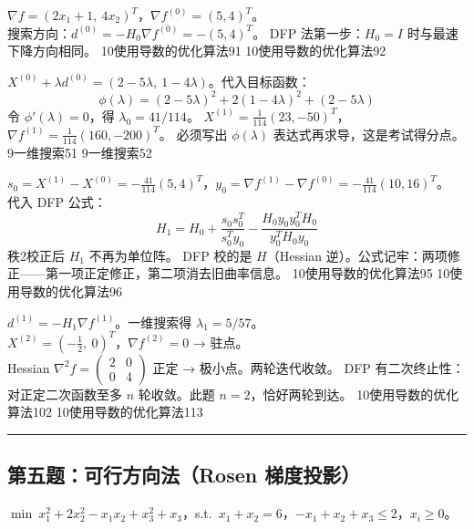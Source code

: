   {$\nabla f = (2x_1+1,\ 4x_2)^T$，$\nabla f^{(0)} = (5, 4)^T$。\\
  搜索方向：$d^{(0)} = -H_0 \nabla f^{(0)} = -(5, 4)^T$。}
  {DFP 法第一步：$H_0=I$ 时与最速下降方向相同。}
  {10使用导数的优化算法}{91}
  {10使用导数的优化算法}{92}

  {$X^{(0)} + \lambda d^{(0)} = (2-5\lambda,\ 1-4\lambda)$。代入目标函数：
  \[
  \phi(\lambda) = (2-5\lambda)^2 + 2(1-4\lambda)^2 + (2-5\lambda)
  \]
  令 $\phi'(\lambda)=0$，得 $\lambda_0 = 41/114$。
  $X^{(1)} = \frac{1}{114}(23, -50)^T$，
  $\nabla f^{(1)} = \frac{1}{114}(160, -200)^T$。}
  {必须写出 $\phi(\lambda)$ 表达式再求导，这是考试得分点。}
  {9一维搜索}{51}
  {9一维搜索}{52}

  {$s_0 = X^{(1)}-X^{(0)} = -\frac{41}{114}(5,4)^T$，$y_0 = \nabla f^{(1)}-\nabla f^{(0)} = -\frac{41}{114}(10,16)^T$。\\
  代入 DFP 公式：
  \[
  H_1 = H_0 + \frac{s_0 s_0^T}{s_0^T y_0} - \frac{H_0 y_0 y_0^T H_0}{y_0^T H_0 y_0}
  \]
  秩2校正后 $H_1$ 不再为单位阵。}
  {DFP 校的是 $H$（Hessian 逆）。公式记牢：两项修正——第一项正定修正，第二项消去旧曲率信息。}
  {10使用导数的优化算法}{95}
  {10使用导数的优化算法}{96}

  {$d^{(1)} = -H_1 \nabla f^{(1)}$。一维搜索得 $\lambda_1 = 5/57$。\\
  $X^{(2)} = (-\frac{1}{2},\ 0)^T$，$\nabla f^{(2)} = 0$ → 驻点。\\
  Hessian $\nabla^2 f = \begin{pmatrix}2&0\\0&4\end{pmatrix}$ 正定 → 极小点。两轮迭代收敛。}
  {DFP 有二次终止性：对正定二次函数至多 $n$ 轮收敛。此题 $n=2$，恰好两轮到达。}
  {10使用导数的优化算法}{102}
  {10使用导数的优化算法}{113}

\rule{\textwidth}{0.4pt}

\subsection*{第五题：可行方向法（Rosen 梯度投影）}

\noindent $\min\ x_1^2+2x_2^2-x_1x_2+x_3^2+x_3$，s.t.\ $x_1+x_2=6$，$-x_1+x_2+x_3\le 2$，$x_i\ge 0$。

